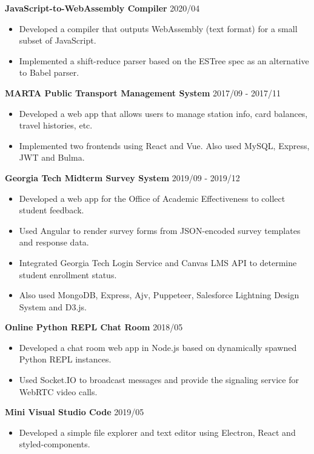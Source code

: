 \documentclass[12pt]{article}
\begin{document}
\textbf{JavaScript-to-WebAssembly Compiler} \hfill 2020/04
\begin{itemize}
\item Developed a compiler that outputs WebAssembly (text format) for a small subset of JavaScript.
\item Implemented a shift-reduce parser based on the ESTree spec as an alternative to Babel parser.
\end{itemize}

\textbf{MARTA Public Transport Management System} \hfill 2017/09 - 2017/11
\begin{itemize}
\item Developed a web app that allows users to manage station info, card balances, travel histories, etc.
\item Implemented two frontends using React and Vue. Also used MySQL, Express, JWT and Bulma.
\end{itemize}

\textbf{\bfseries Georgia Tech Midterm Survey System} \hfill 2019/09 - 2019/12
\begin{itemize}
\item Developed a web app for the Office of Academic Effectiveness to collect  student feedback.
\item Used Angular to render survey forms from JSON-encoded survey templates and response data.
\item Integrated Georgia Tech Login Service and Canvas LMS API to determine student enrollment status.
\item Also used MongoDB, Express, Ajv, Puppeteer, Salesforce Lightning Design System and D3.js.
\end{itemize}

\textbf{Online Python REPL Chat Room}  \hfill 2018/05
\begin{itemize}
\item Developed a chat room web app in Node.js based on dynamically spawned Python REPL instances.
\item Used Socket.IO to broadcast messages and provide the signaling service for WebRTC video calls.
\end{itemize}

\textbf{Mini Visual Studio Code}  \hfill 2019/05
\begin{itemize}
\item Developed a simple file explorer and text editor using Electron, React and styled-components.
\end{itemize}
\end{document}
